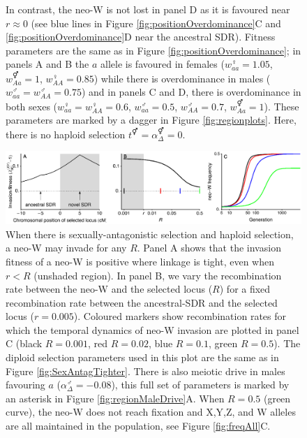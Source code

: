 \documentclass[12pt]{article}
\begin{document}
\begin{figure}[!h]
{In contrast, the neo-W is not lost in panel D as it is favoured near $r\approx0$ (see blue lines in Figure \ref{fig:positionOverdominance}C and  \ref{fig:positionOverdominance}D near the ancestral SDR). 
Fitness parameters are the same as in Figure \ref{fig:positionOverdominance}; in panels A and B the $a$ allele is favoured in females ($w_{aa}^\female=1.05$, $w_{Aa}^\Hermaphrodite=1$, $w_{AA}^\female=0.85$) while there is overdominance in males ($w_{aa}^\male=w_{AA}^\male=0.75$) and in panels C and D, there is overdominance in both sexes ($w_{aa}^\female=w_{AA}^\female=0.6$, $w_{aa}^\male=0.5$, $w_{AA}^\male=0.7$, $w_{Aa}^\Hermaphrodite=1$). 
These parameters are marked by a dagger in Figure \ref{fig:regionplots}. 
Here, there is no haploid selection $t^\Hermaphrodite = \alpha^\Hermaphrodite_\Delta = 0$.
}
\label{fig:temporalOverdominance}
\end{figure}

\begin{figure}[!h]
\centering
\centerline{\includegraphics[width=1.5\linewidth]{PositionPlot_SexAntagTighter_MaleDrive.eps}}
\caption{
When there is sexually-antagonistic selection and haploid selection, a neo-W may invade for any $R$.
Panel A shows that the invasion fitness of a neo-W is positive where linkage is tight, even when $r<R$ (unshaded region).
In panel B, we vary the recombination rate between the neo-W and the selected locus ($R$) for a fixed recombination rate between the ancestral-SDR and the selected locus ($r=0.005$).
Coloured markers show recombination rates for which the temporal dynamics of neo-W invasion are plotted in panel C (black $R=0.001$, red $R=0.02$, blue $R=0.1$, green $R=0.5$). 
The diploid selection parameters used in this plot are the same as in Figure \ref{fig:SexAntagTighter}. 
There is also meiotic drive in males favouring $a$ ($\alpha_{\Delta}^\male=-0.08$), this full set of parameters is marked by an asterisk in Figure \ref{fig:regionMaleDrive}A.
When $R=0.5$ (green curve), the neo-W does not reach fixation and X,Y,Z, and W alleles are all maintained in the population, see Figure \ref{fig:freqAll}C.
}
\label{fig:SexAntagTighterMaleDrive}
\end{figure}
\end{document}
